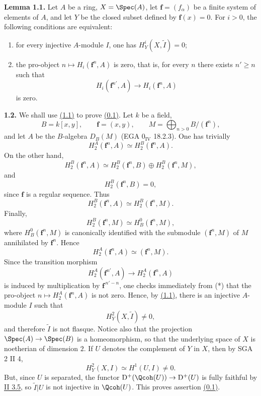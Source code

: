 \textbf{Lemma 1.1.} Let $A$ be a ring, $X=\Spec(A)$, let $\mathbf f=(f_\alpha)$ be a finite system of elements of $A$, and let $Y$ be the closed subset defined by $\mathbf f(x)=0$. For $i>0$, the following conditions are equivalent:
\begin{enumerate}[label=(\roman*)]
\item for every injective $A$-module $I$, one has $H^i_Y(X,\widetilde I)=0$;
\item the pro-object $n\mapsto H_i(\mathbf f^n,A)$ is zero, that is, for every $n$ there exists $n'\geq n$ such that
\[
 H_i(\mathbf f^{n'},A)\longrightarrow H_i(\mathbf f^n,A)
\]
is zero.
\end{enumerate}

\textbf{1.2.} We shall use \hyperlink{sga6.e02.lem.1-1}{(1.1)} to prove \hyperlink{sga6.e02.para.0-1}{(0.1)}. Let $k$ be a field,
\[
 B=k[x,y],\qquad \mathbf f=(x,y),\qquad
 M=\bigoplus_{n>0}B/(\mathbf f^n),
\]
and let $A$ be the $B$-algebra $D_B(M)$ (EGA $0_{\mathrm{IV}}$ 18.2.3). One has trivially
\[
 H_2^A(\mathbf f^n,A)\simeq H_2^B(\mathbf f^n,A).
\]
On the other hand,
\[
 H_2^B(\mathbf f^n,A)\simeq H_2^B(\mathbf f^n,B)\oplus H_2^B(\mathbf f^n,M),
\]
and
\[
 H_2^B(\mathbf f^n,B)=0,
\]
since $\mathbf f$ is a regular sequence. Thus
\[
 H_2^B(\mathbf f^n,A)\simeq H_2^B(\mathbf f^n,M).
\]
Finally,
\[
 H_2^B(\mathbf f^n,M)\simeq H_B^0(\mathbf f^n,M),
\]
where $H_B^0(\mathbf f^n,M)$ is canonically identified with the submodule $(\mathbf f^n,M)$ of $M$ annihilated by $\mathbf f^n$. Hence
\begin{equation}\tag{*}
 H_2^A(\mathbf f^n,A)\simeq (\mathbf f^n,M).
\end{equation}
Since the transition morphism
\[
 H_2^A(\mathbf f^{n'},A)\longrightarrow H_2^A(\mathbf f^n,A)
\]
is induced by multiplication by $\mathbf f^{\,n'-n}$, one checks immediately from (*) that the pro-object $n\mapsto H_2^A(\mathbf f^n,A)$ is not zero. Hence, by \hyperlink{sga6.e02.lem.1-1}{(1.1)}, there is an injective $A$-module $I$ such that
\[
 H^2_Y(X,\widetilde I)\ne0,
\]
and therefore $\widetilde I$ is not flasque. Notice also that the projection $\Spec(A)\to\Spec(B)$ is a homeomorphism, so that the underlying space of $X$ is noetherian of dimension $2$. If $U$ denotes the complement of $Y$ in $X$, then by SGA 2 II 4,
\[
 H^2_Y(X,I)\simeq H^1(U,I)\ne0.
\]
But, since $U$ is separated, the functor $\mathrm D^+(\Qcoh(U))\to\mathrm D^+(U)$ is fully faithful by \hyperlink{sga6.e02.prop.3-5}{II 3.5}, so $\widetilde I|U$ is not injective in $\Qcoh(U)$. This proves assertion \hyperlink{sga6.e02.para.0-1}{(0.1)}.

